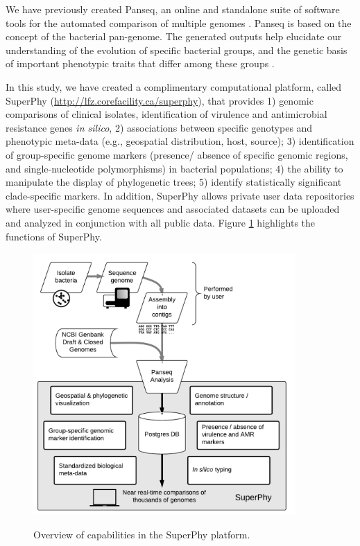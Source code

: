 \documentclass[a4paper,twoside]{article}
\begin{document}
We have previously created Panseq, an online and standalone suite of software tools for the automated comparison of multiple genomes \cite{laing_pan-genome_2010,laing_identification_2011}. Panseq is based on the concept of the bacterial pan-genome. The generated outputs help elucidate our understanding of the evolution of specific bacterial groups, and the genetic basis of important phenotypic traits that differ among these groups \cite{laing_pan-genome_2010}.

In this study, we have created a complimentary computational platform, called SuperPhy (\url{http://lfz.corefacility.ca/superphy}), that provides 1) genomic comparisons of clinical isolates, identification of virulence and antimicrobial resistance genes \textit{in silico}, 2) associations between specific genotypes and phenotypic meta-data (e.g., geospatial distribution, host, source); 3) identification of group-specific genome markers (presence/ absence of specific genomic regions, and single-nucleotide polymorphisms) in bacterial populations; 4) the ability to manipulate the display of phylogenetic trees; 5) identify statistically significant clade-specific markers. In addition, SuperPhy allows private user data repositories where user-specific genome sequences and associated datasets can be uploaded and analyzed in conjunction with all public data. Figure \ref{fig:capabilities} highlights the functions of SuperPhy.

\begin{figure}[t]
  \vspace{-0.2cm}
  \centering
   {\includegraphics[width=10cm]{capabilities.pdf}}
  \caption{Overview of capabilities in the SuperPhy platform.}
  \label{fig:capabilities}
\end{figure}
\end{document}
